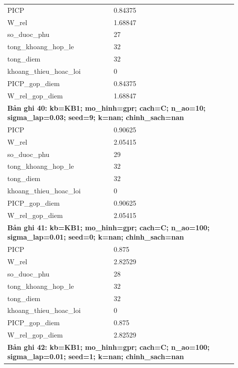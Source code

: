 \begin{longtable}{p{0.43\linewidth}p{0.50\linewidth}}
PICP & 0.84375 \\
W\_\allowbreak rel & 1.68847 \\
so\_\allowbreak duoc\_\allowbreak phu & 27 \\
tong\_\allowbreak khoang\_\allowbreak hop\_\allowbreak le & 32 \\
tong\_\allowbreak diem & 32 \\
khoang\_\allowbreak thieu\_\allowbreak hoac\_\allowbreak loi & 0 \\
PICP\_\allowbreak gop\_\allowbreak diem & 0.84375 \\
W\_\allowbreak rel\_\allowbreak gop\_\allowbreak diem & 1.68847 \\
\midrule
\multicolumn{2}{p{0.95\linewidth}}{\textbf{Bản ghi 40: kb=KB1; mo\_hinh=gpr; cach=C; n\_ao=10; sigma\_lap=0.03; seed=9; k=nan; chinh\_sach=nan}} \\
PICP & 0.90625 \\
W\_\allowbreak rel & 2.05415 \\
so\_\allowbreak duoc\_\allowbreak phu & 29 \\
tong\_\allowbreak khoang\_\allowbreak hop\_\allowbreak le & 32 \\
tong\_\allowbreak diem & 32 \\
khoang\_\allowbreak thieu\_\allowbreak hoac\_\allowbreak loi & 0 \\
PICP\_\allowbreak gop\_\allowbreak diem & 0.90625 \\
W\_\allowbreak rel\_\allowbreak gop\_\allowbreak diem & 2.05415 \\
\midrule
\multicolumn{2}{p{0.95\linewidth}}{\textbf{Bản ghi 41: kb=KB1; mo\_hinh=gpr; cach=C; n\_ao=100; sigma\_lap=0.01; seed=0; k=nan; chinh\_sach=nan}} \\
PICP & 0.875 \\
W\_\allowbreak rel & 2.82529 \\
so\_\allowbreak duoc\_\allowbreak phu & 28 \\
tong\_\allowbreak khoang\_\allowbreak hop\_\allowbreak le & 32 \\
tong\_\allowbreak diem & 32 \\
khoang\_\allowbreak thieu\_\allowbreak hoac\_\allowbreak loi & 0 \\
PICP\_\allowbreak gop\_\allowbreak diem & 0.875 \\
W\_\allowbreak rel\_\allowbreak gop\_\allowbreak diem & 2.82529 \\
\midrule
\multicolumn{2}{p{0.95\linewidth}}{\textbf{Bản ghi 42: kb=KB1; mo\_hinh=gpr; cach=C; n\_ao=100; sigma\_lap=0.01; seed=1; k=nan; chinh\_sach=nan}} \\

\end{longtable}
